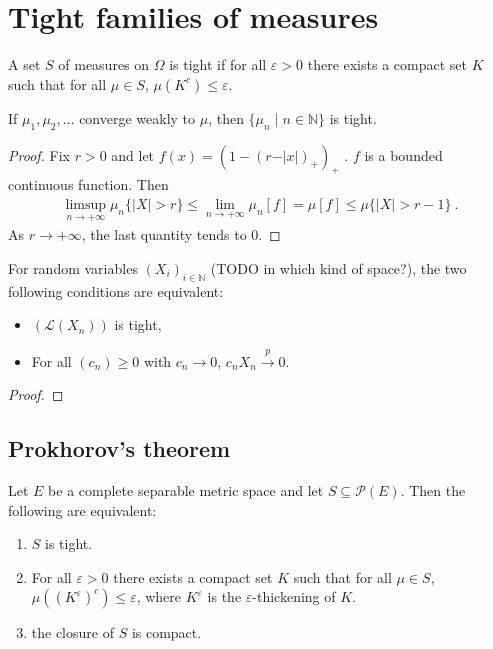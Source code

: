 \chapter{Tight families of measures}

\begin{definition}\label{def:tight}
 \leanok
A set $S$ of measures on $\Omega$ is tight if for all $\varepsilon > 0$ there exists a compact set $K$ such that for all $\mu \in S$, $\mu(K^c) \le \varepsilon$.
\end{definition}

\begin{lemma}\label{lem:tight_of_cvg}
If $\mu_1, \mu_2, \ldots$ converge weakly to $\mu$, then $\{\mu_n \mid n \in \mathbb{N}\}$ is tight.
\end{lemma}

\begin{proof}
Fix $r > 0$ and let $f(x) = (1 - (r - \vert x \vert)_+)_+$ . $f$ is a bounded continuous function. Then
\begin{align*}
\limsup_{n \to +\infty} \mu_n\{\vert X \vert > r\}
\le \lim_{n \to +\infty} \mu_n\left[ f \right]
= \mu[f]
\le \mu\{\vert X \vert > r - 1\} \: .
\end{align*}
As $r \to +\infty$, the last quantity tends to 0.
\end{proof}

\begin{lemma}\label{tight_iff_cvg_probability}
For random variables $(X_i)_{i \in \mathbb{N}}$ (TODO in which kind of space?), the two following conditions are equivalent:
\begin{itemize}
	\item $(\mathcal L(X_n))$ is tight,
	\item For all $(c_n) \ge 0$ with $c_n \to 0$, $c_n X_n \xrightarrow{p} 0$.
\end{itemize}
\end{lemma}

\begin{proof}

\end{proof}


\section{Prokhorov's theorem}

\begin{theorem}\label{thm:prokhorov}
Let $E$ be a complete separable metric space and let $S \subseteq \mathcal P(E)$. Then the following are equivalent:
\begin{enumerate}
	\item $S$ is tight.
	\item For all $\varepsilon > 0$ there exists a compact set $K$ such that for all $\mu \in S$, $\mu((K^\varepsilon)^c) \le \varepsilon$, where $K^\varepsilon$ is the $\varepsilon$-thickening of $K$.
	\item the closure of $S$ is compact.
\end{enumerate}
\end{theorem}

